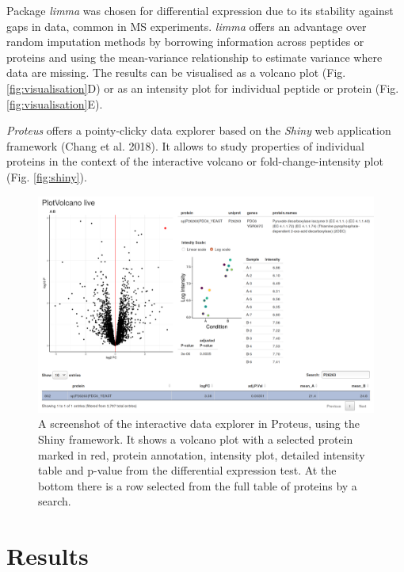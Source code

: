 \documentclass[]{article}
\begin{document}
Package \emph{limma} was chosen for differential expression due to its
stability against gaps in data, common in MS experiments. \emph{limma}
offers an advantage over random imputation methods by borrowing
information across peptides or proteins and using the mean-variance
relationship to estimate variance where data are missing. The results
can be visualised as a volcano plot (Fig. \ref{fig:visualisation}D) or
as an intensity plot for individual peptide or protein (Fig.
\ref{fig:visualisation}E).

\emph{Proteus} offers a pointy-clicky data explorer based on the
\emph{Shiny} web application framework (Chang et al. 2018). It allows to
study properties of individual proteins in the context of the
interactive volcano or fold-change-intensity plot (Fig.
\ref{fig:shiny}).

\begin{figure}[H]

{\centering \includegraphics{../volcano_live_screenshot} 

}

\caption{\label{fig:shiny}A screenshot of the interactive data explorer in Proteus, using the Shiny framework. It shows a volcano plot with a selected protein marked in red, protein annotation, intensity plot, detailed intensity table and p-value from the differential expression test. At the bottom there is a row selected from the full table of proteins by a search.}\label{fig:fig_shiny}
\end{figure}

\section{Results}\label{results}
\end{document}

